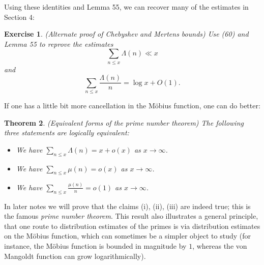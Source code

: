\documentclass[10pt,reqno]{amsart}
\newtheorem{theorem}{Theorem}
\newtheorem{exercise}[theorem]{Exercise}
\begin{document}
Using these identities and Lemma 55, we can recover many of the estimates in Section 4:

\begin{exercise} (Alternate proof of Chebyshev and Mertens bounds) Use (60) and Lemma 55 to reprove the estimates
    \[  \sum_{n \leq x} \Lambda(n) \ll x\]
    and
    \[  \sum_{n \leq x} \frac{\Lambda(n)}{n} = \log x + O(1).\]
\end{exercise}

If one has a little bit more cancellation in the Möbius function, one can do better:

\begin{theorem} (Equivalent forms of the prime number theorem) The following three statements are logically equivalent:
    \begin{itemize}
        \item[(i)] We have $\sum_{n \leq x} \Lambda(n) = x + o(x)$ as $x \rightarrow \infty$.
        \item[(ii)] We have $\sum_{n \leq x} \mu(n) = o(x)$ as $x \rightarrow \infty$.
        \item[(iii)] We have $\sum_{n \leq x} \frac{\mu(n)}{n} = o(1)$ as $x \rightarrow \infty$.
    \end{itemize}
\end{theorem}

In later notes we will prove that the claims (i), (ii), (iii) are indeed true; this is the famous \emph{prime number theorem}. This result also illustrates a general principle, that one route to distribution estimates of the primes is via distribution estimates on the Möbius function, which can sometimes be a simpler object to study (for instance, the Möbius function is bounded in magnitude by $1$, whereas the von Mangoldt function can grow logarithmically).
\end{document}
